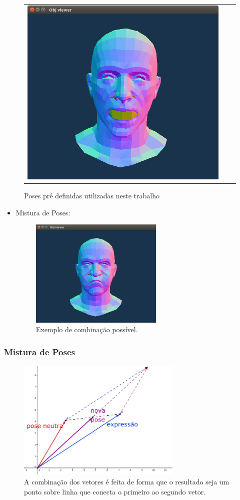 \documentclass[brazil]{beamer}
\begin{document}
\begin{frame}
\begin{itemize}
\begin{figure}
\begin{tabular}{ccc}
\includegraphics[width=0.3\linewidth]{./img/open-mouth.png} \\
	\end{tabular}
	\caption{Poses pré definidas utilizadas neste trabalho}
     \end{figure}         
  \end{itemize} 
\end{frame}

\begin{frame}
  \begin{itemize}
  \item Mistura de Poses:
  \begin{figure}
\centering
\includegraphics[width = 0.6\textwidth, keepaspectratio]{./img/poseCombinada.png}
        \caption{Exemplo de combinação possível. }
     \end{figure}         
  \end{itemize} 
\end{frame}

\begin{frame}
\frametitle{Mistura de Poses}

	\begin{figure}
        \centering
        \includegraphics[width = 0.7\textwidth, keepaspectratio]{./img/vectors00.png}
        \caption{A combinação dos vetores é feita de forma que o resultado seja
          um ponto sobre linha que conecta o primeiro ao segundo vetor.}
      \end{figure}
\end{frame}
\end{document}
